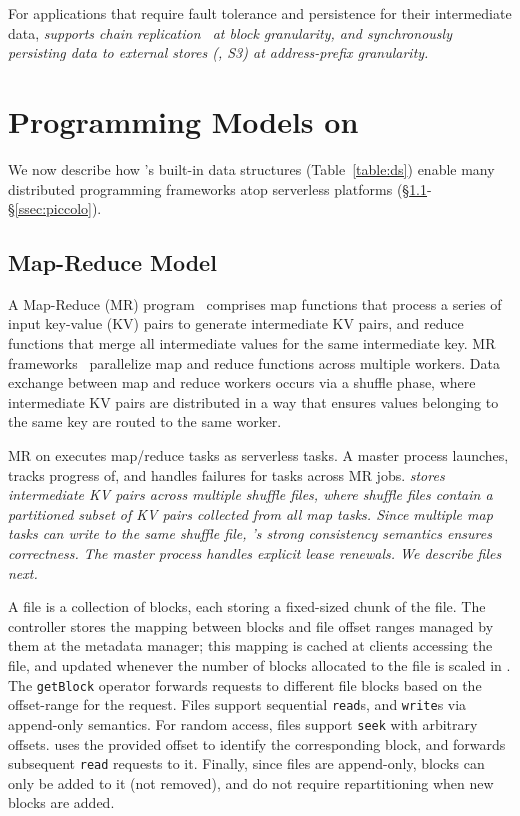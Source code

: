 For applications that require fault tolerance and persistence for their intermediate data, \sl supports chain replication~\cite{chainreplication} at block granularity, and synchronously persisting data to external stores (\eg, S3) at address-prefix granularity.


\section{Programming Models on \jiffy}
\label{sec:jiffymodels}

We now describe how \jiffy's built-in data structures (Table~\ref{table:ds}) 
enable many distributed programming frameworks atop serverless platforms 
(\S\ref{ssec:bsp}-\S\ref{ssec:piccolo}). 


\subsection{Map-Reduce Model}
\label{ssec:bsp}

A Map-Reduce (MR) program~\cite{mapreduce} comprises map
functions that process a series of input key-value (KV) pairs 
to generate intermediate KV pairs, and reduce functions that merge 
all intermediate values for the same intermediate key. MR 
frameworks~\cite{mapreduce, hadoop, spark} parallelize map and reduce 
functions across multiple workers. Data exchange between
map and reduce workers occurs via a shuffle phase, where intermediate
KV pairs are distributed in a way that ensures values belonging
to the same key are routed to the same worker.

MR on \jiffy executes map/reduce tasks as serverless tasks. A
master process launches, tracks progress of, and handles failures for 
tasks across MR jobs. \sl stores intermediate
KV pairs across multiple shuffle files, where
shuffle files contain a partitioned subset of KV pairs
collected from all map tasks. Since multiple map tasks can 
write to the same shuffle file, \jiffy's strong consistency 
semantics ensures correctness. The master 
process handles explicit lease renewals. We describe \jiffy files next.

 A \jiffy file is a collection of blocks, each storing a fixed-sized chunk of the file. 
The controller stores the mapping between blocks and
file offset ranges managed by them at the metadata manager;
this mapping is cached at clients accessing the file, and updated
whenever the number of blocks allocated to the file is scaled in \jiffy.
The \texttt{getBlock} operator forwards requests to different file blocks 
based on the offset-range for the request.
Files support sequential \texttt{read}s, and \texttt{write}s via 
append-only semantics. For random access, 
files support \texttt{seek} with arbitrary offsets. 
\jiffy uses the provided offset to identify the corresponding 
block, and forwards subsequent \texttt{read}
requests to it. Finally, since files are append-only, blocks 
can only be added to it (not removed), and do not require 
repartitioning when new blocks are added. 

